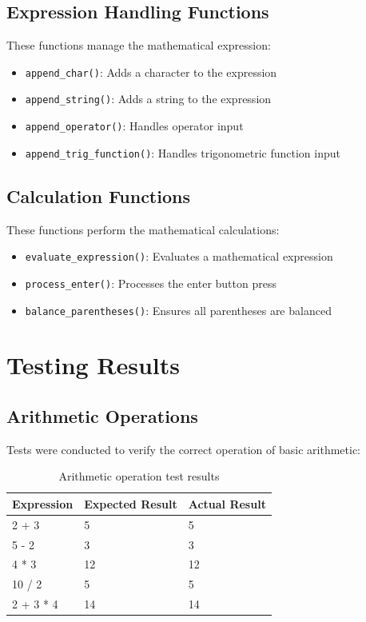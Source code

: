 \documentclass[12pt,a4paper]{article}
\begin{document}
\subsection{Expression Handling Functions}
These functions manage the mathematical expression:
\begin{itemize}
    \item \texttt{append\_char()}: Adds a character to the expression
    \item \texttt{append\_string()}: Adds a string to the expression
    \item \texttt{append\_operator()}: Handles operator input
    \item \texttt{append\_trig\_function()}: Handles trigonometric function input
\end{itemize}

\subsection{Calculation Functions}
These functions perform the mathematical calculations:
\begin{itemize}
    \item \texttt{evaluate\_expression()}: Evaluates a mathematical expression
    \item \texttt{process\_enter()}: Processes the enter button press
    \item \texttt{balance\_parentheses()}: Ensures all parentheses are balanced
\end{itemize}

\section{Testing Results}
\subsection{Arithmetic Operations}
Tests were conducted to verify the correct operation of basic arithmetic:
\begin{table}[h]
\centering
\begin{tabular}{|l|l|l|}
\hline
\textbf{Expression} & \textbf{Expected Result} & \textbf{Actual Result} \\
\hline
2 + 3 & 5 & 5 \\
\hline
5 - 2 & 3 & 3 \\
\hline
4 * 3 & 12 & 12 \\
\hline
10 / 2 & 5 & 5 \\
\hline
2 + 3 * 4 & 14 & 14 \\
\hline
\end{tabular}
\caption{Arithmetic operation test results}
\end{table}
\end{document}
